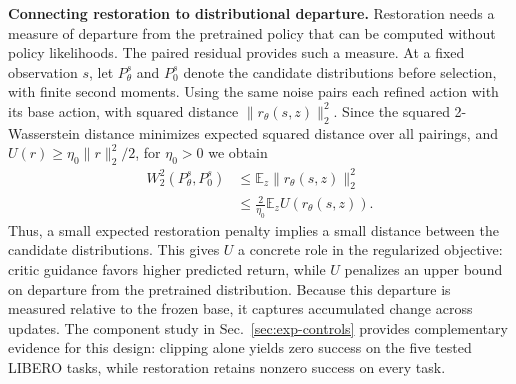 \textbf{Connecting restoration to distributional departure.}
Restoration needs a measure of departure from the pretrained policy that can be computed without policy likelihoods. The paired residual provides such a measure. At a fixed observation $s$, let $P_\theta^s$ and $P_0^s$ denote the candidate distributions before selection, with finite second moments. Using the same noise pairs each refined action with its base action, with squared distance $\|r_\theta(s,z)\|_2^2$. Since the squared 2-Wasserstein distance minimizes expected squared distance over all pairings, and $U(r)\geq\eta_0\|r\|_2^2/2$, for $\eta_0>0$ we obtain
\begin{equation}
\begin{aligned}
W_2^2(P_\theta^s,P_0^s)
&\leq \mathbb E_z\|r_\theta(s,z)\|_2^2\\
&\leq \frac{2}{\eta_0}\mathbb E_z U(r_\theta(s,z)).
\end{aligned}
\label{eq:coupling-bound}
\end{equation}
Thus, a small expected restoration penalty implies a small distance between the candidate distributions. This gives $U$ a concrete role in the regularized objective: critic guidance favors higher predicted return, while $U$ penalizes an upper bound on departure from the pretrained distribution. Because this departure is measured relative to the frozen base, it captures accumulated change across updates. The component study in Sec.~\ref{sec:exp-controls} provides complementary evidence for this design: clipping alone yields zero success on the five tested LIBERO tasks, while restoration retains nonzero success on every task.
